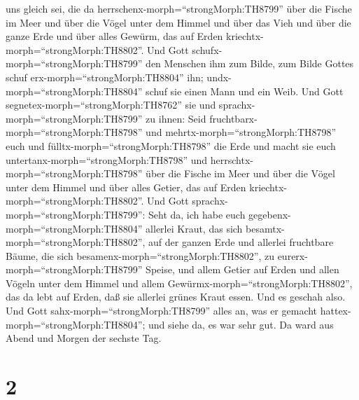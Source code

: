 uns gleich sei, die da herrschenx-morph=``strongMorph:TH8799'' über die
Fische im Meer und über die Vögel unter dem Himmel und über das Vieh und
über die ganze Erde und über alles Gewürm, das auf Erden
kriechtx-morph=``strongMorph:TH8802''.  Und Gott
schufx-morph=``strongMorph:TH8799'' den Menschen ihm zum Bilde, zum
Bilde Gottes schuf erx-morph=``strongMorph:TH8804'' ihn;
undx-morph=``strongMorph:TH8804'' schuf sie einen Mann und ein Weib.
 Und Gott segnetex-morph=``strongMorph:TH8762'' sie und
sprachx-morph=``strongMorph:TH8799'' zu ihnen: Seid
fruchtbarx-morph=``strongMorph:TH8798'' und
mehrtx-morph=``strongMorph:TH8798'' euch und
fülltx-morph=``strongMorph:TH8798'' die Erde und macht sie euch
untertanx-morph=``strongMorph:TH8798'' und
herrschtx-morph=``strongMorph:TH8798'' über die Fische im Meer und über
die Vögel unter dem Himmel und über alles Getier, das auf Erden
kriechtx-morph=``strongMorph:TH8802''.  Und Gott
sprachx-morph=``strongMorph:TH8799'': Seht da, ich habe euch
gegebenx-morph=``strongMorph:TH8804'' allerlei Kraut, das sich
besamtx-morph=``strongMorph:TH8802'', auf der ganzen Erde und allerlei
fruchtbare Bäume, die sich besamenx-morph=``strongMorph:TH8802'', zu
eurerx-morph=``strongMorph:TH8799'' Speise,  und allem
Getier auf Erden und allen Vögeln unter dem Himmel und allem
Gewürmx-morph=``strongMorph:TH8802'', das da lebt auf Erden, daß sie
allerlei grünes Kraut essen. Und es geschah also.  Und Gott
sahx-morph=``strongMorph:TH8799'' alles an, was er gemacht
hattex-morph=``strongMorph:TH8804''; und siehe da, es war sehr gut. Da
ward aus Abend und Morgen der sechste Tag.

\hypertarget{section-1}{%
\section{2}\label{section-1}}

